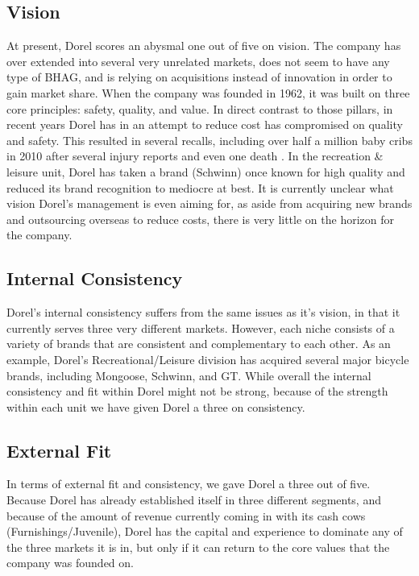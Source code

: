 {\subsection{Vision}
At present, Dorel scores an abysmal one out of five on vision.  The company has over extended into several very unrelated markets, does not seem to have any type of BHAG, and is relying on acquisitions instead of innovation in order to gain market share.  When the company was founded in 1962, it was built on three core principles: safety, quality, and value.  In direct contrast to those pillars, in recent years Dorel has in an attempt to reduce cost has compromised on quality and safety. This resulted in several recalls, including over half a million baby cribs in 2010 after several injury reports and even one death \cite{Commission2010}.  In the recreation \& leisure unit, Dorel has taken a brand (Schwinn) once known for high quality and reduced its brand recognition to mediocre at best.  It is currently unclear what vision Dorel’s management is even aiming for, as aside from acquiring new brands and outsourcing overseas to reduce costs, there is very little on the horizon for the company.  

\subsection{Internal Consistency}
Dorel’s internal consistency suffers from the same issues as it’s vision, in that it currently serves three very different markets.  However, each niche consists of a variety of brands that are consistent and complementary to each other.  As an example, Dorel’s Recreational/Leisure division has acquired several major bicycle brands, including Mongoose, Schwinn, and GT.  While overall the internal consistency and fit within Dorel might not be strong, because of the strength within each unit we have given Dorel a three on consistency.

\subsection{External Fit}
In terms of  external fit and consistency, we gave Dorel a three out of five.  Because Dorel has already established itself in three different segments, and because of the amount of revenue currently coming in with its cash cows (Furnishings/Juvenile), Dorel has the capital and experience to dominate any of the three markets it is in, but only if it can return to the core values that the company was founded on.

}
